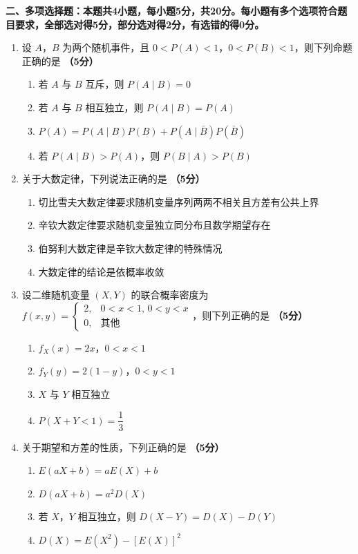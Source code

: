 \documentclass[12pt, a4paper]{ctexart}
\newcommand{\score}[1]{\hfill\textbf{（#1分）}}
\begin{document}
\vspace{10pt}

{\large\bfseries 二、多项选择题：本题共4小题，每小题5分，共20分。每小题有多个选项符合题目要求，全部选对得5分，部分选对得2分，有选错的得0分。}

\vspace{8pt}

\begin{enumerate}[resume]

\item 设 $A$，$B$ 为两个随机事件，且 $0<P(A)<1$，$0<P(B)<1$，则下列命题正确的是 \score{5}
\begin{enumerate}[label=\Alph*.]
    \item 若 $A$ 与 $B$ 互斥，则 $P(A\mid B)=0$
    \item 若 $A$ 与 $B$ 相互独立，则 $P(A\mid B)=P(A)$
    \item $P(A)=P(A\mid B)P(B)+P(A\mid \bar{B})P(\bar{B})$
    \item 若 $P(A\mid B)>P(A)$，则 $P(B\mid A)>P(B)$
\end{enumerate}

\item 关于大数定律，下列说法正确的是 \score{5}
\begin{enumerate}[label=\Alph*.]
    \item 切比雪夫大数定律要求随机变量序列两两不相关且方差有公共上界
    \item 辛钦大数定律要求随机变量独立同分布且数学期望存在
    \item 伯努利大数定律是辛钦大数定律的特殊情况
    \item 大数定律的结论是依概率收敛
\end{enumerate}

\item 设二维随机变量 $(X,Y)$ 的联合概率密度为 $f(x,y)=\begin{cases} 2, & 0<x<1,\, 0<y<x \\ 0, & \text{其他} \end{cases}$，则下列正确的是 \score{5}
\begin{enumerate}[label=\Alph*.]
    \item $f_X(x)=2x$，$0<x<1$
    \item $f_Y(y)=2(1-y)$，$0<y<1$
    \item $X$ 与 $Y$ 相互独立
    \item $P(X+Y<1)=\dfrac{1}{3}$
\end{enumerate}

\item 关于期望和方差的性质，下列正确的是 \score{5}
\begin{enumerate}[label=\Alph*.]
    \item $E(aX+b)=aE(X)+b$
    \item $D(aX+b)=a^2D(X)$
    \item 若 $X$，$Y$ 相互独立，则 $D(X-Y)=D(X)-D(Y)$
    \item $D(X)=E(X^2)-[E(X)]^2$
\end{enumerate}

\end{enumerate}
\end{document}
